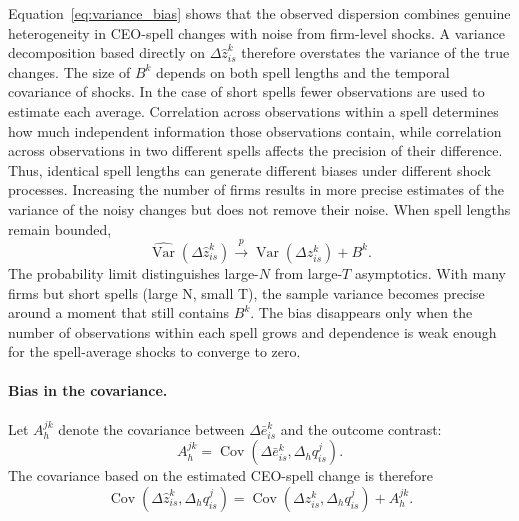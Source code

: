 \documentclass[sigconf,nonacm]{acmart}
\begin{document}
Equation~\eqref{eq:variance_bias} shows that the observed dispersion combines genuine heterogeneity in CEO-spell changes with noise from firm-level shocks. A variance decomposition based directly on $\Delta\widehat z_{is}^{k}$ therefore overstates the variance of the true changes. The size of $B^k$ depends on both spell lengths and the temporal covariance of shocks. In the case of short spells fewer observations are used to estimate each average. Correlation across observations within a spell determines how much independent information those observations contain, while correlation across observations in two different spells affects the precision of their difference. Thus, identical spell lengths can generate different biases under different shock processes. Increasing the number of firms results in more precise estimates of the variance of the noisy changes but does not remove their noise. When spell lengths remain bounded,
\begin{equation}
\widehat{\operatorname{Var}}\!\left(
\Delta\widehat z_{is}^{k}
\right)
\overset{p}{\longrightarrow}
\operatorname{Var}\!\left(
\Delta z_{is}^{k}
\right)
+
B^{k}.
\label{eq:variance_plim}
\end{equation}
The probability limit distinguishes large-$N$ from large-$T$ asymptotics. With many firms but short spells (large N, small T), the sample variance becomes precise around a moment that still contains $B^k$. The bias disappears only when the number of observations within each spell grows and dependence is weak enough for the spell-average shocks to converge to zero.
\vspace{.2cm}

\paragraph{Bias in the covariance.} Let $A_h^{jk}$ denote the covariance between $\Delta\bar e_{is}^{k}$ and the outcome contrast:
\begin{equation}
A_h^{jk}
=
\operatorname{Cov}\!\left(
\Delta\bar e_{is}^{k},
\Delta_h q_{is}^{j}
\right).
\label{eq:A_definition}
\end{equation}
The covariance based on the estimated CEO-spell change is therefore
\begin{equation}
\operatorname{Cov}\!\left(
\Delta\widehat z_{is}^{k},
\Delta_h q_{is}^{j}
\right)
=
\operatorname{Cov}\!\left(
\Delta z_{is}^{k},
\Delta_h q_{is}^{j}
\right)
+
A_h^{jk}.
\label{eq:covariance_bias}
\end{equation}
\end{document}
